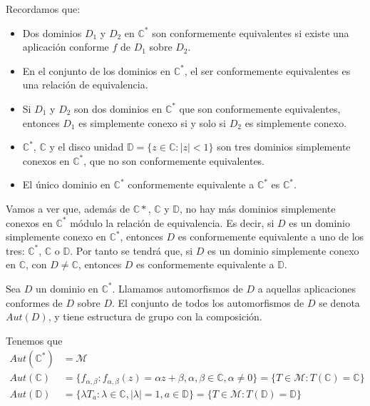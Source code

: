 Recordamos que:
\begin{itemize}
    \item Dos dominios $D_1$ y $D_2$ en $\mathbb{C}^\ast$ son conformemente equivalentes si existe una aplicación conforme $f$ de $D_1$ sobre $D_2$.
    \item En el conjunto de los dominios en $\mathbb{C}^\ast$, el ser conformemente equivalentes es una relación de equivalencia.
    \item Si $D_1$ y $D_2$ son dos dominios en $\mathbb{C}^\ast$ que son conformemente equivalentes, entonces $D_1$ es simplemente conexo si y solo si $D_2$ es simplemente conexo.
    \item $\mathbb{C}^\ast$, $\mathbb{C}$ y el disco unidad $\mathbb{D} = \{z \in \mathbb{C} : |z| < 1\}$ son tres dominios simplemente conexos en $\mathbb{C}^\ast$, que no son conformemente equivalentes.
    \item El único dominio en $\mathbb{C}^\ast$ conformemente equivalente a $\mathbb{C}^\ast$ es $\mathbb{C}^\ast$.
\end{itemize}

Vamos a ver que, además de $\mathbb{C}\ast$, $\mathbb{C}$ y $\mathbb{D}$, no hay más dominios simplemente conexos en $\mathbb{C}^\ast$ módulo la relación de equivalencia.
Es decir, si $D$ es un dominio simplemente conexo en $\mathbb{C}^\ast$, entonces $D$ es conformemente equivalente a uno de los tres: $\mathbb{C}^\ast$, $\mathbb{C}$ o $\mathbb{D}$.
Por tanto se tendrá que, si $D$ es un dominio simplemente conexo en $\mathbb{C}$, con $D \neq \mathbb{C}$, entonces $D$ es conformemente equivalente a $\mathbb{D}$.

\begin{definition}
    Sea $D$ un dominio en $\mathbb{C}^\ast$.
    Llamamos automorfismos de $D$ a aquellas aplicaciones conformes de $D$ sobre $D$.
    El conjunto de todos los automorfismos de $D$ se denota $Aut(D)$, y tiene estructura de grupo con la composición.
\end{definition}

Tenemos que
\begin{align*}
    Aut(\mathbb{C}^\ast) & = \mathcal{M}                                                                                                                                                       \\
    Aut(\mathbb{C})      & = \{f_{\alpha, \beta} : f_{\alpha, \beta}(z) = \alpha z + \beta, \alpha, \beta \in \mathbb{C}, \alpha \neq 0\} = \{T \in \mathcal{M} : T(\mathbb{C}) = \mathbb{C}\} \\
    Aut(\mathbb{D})      & = \{\lambda T_a : \lambda \in \mathbb{C}, |\lambda| = 1, a \in \mathbb{D}\} = \{T \in \mathcal{M} : T(\mathbb{D}) = \mathbb{D}\}
\end{align*}

